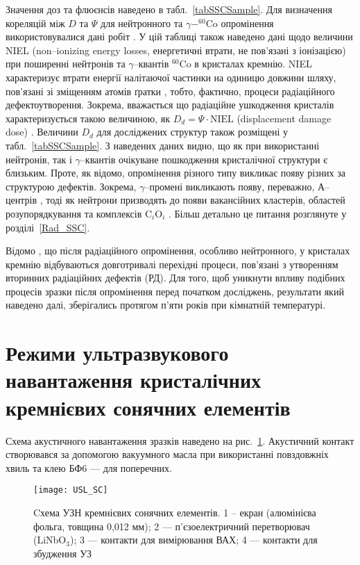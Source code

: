 Значення доз та флюєнсів наведено в табл.~\ref{tabSSCSample}.
Для визначення кореляцій між $D$ та $\Psi$ для нейтронного та $\gamma-^{60}$Co опромінення використовувалися дані робіт \cite{NIEL:Akkerman,Brauning}.
У цій таблиці також наведено дані щодо величини NIEL (non--ionizing energy losses, енергетичні втрати, не пов'язані з іонізацією) при поширенні нейтронів та $\gamma$--квантів $^{60}$Co в кристалах кремнію.
NIEL характеризує втрати енергії налітаючої частинки на одиницю довжини шляху, пов'язані зі зміщенням атомів ґратки \cite{NIEL:Huhtinen,NIEL:Messenger}, тобто, фактично, процеси радіаційного дефектоутворення.
Зокрема, вважається що радіаційне ушкодження кристалів характеризується такою величиною, як $D_d=\Psi\cdot \mbox{NIEL}$ (displacement damage dose) \cite{NIEL:Messenger}.
Величини $D_d$ для досліджених структур також розміщені у табл.~\ref{tabSSCSample}.
З наведених даних видно, що як при використанні нейтронів, так і $\gamma$--квантів очікуване пошкодження кристалічної структури є близьким.
Проте, як відомо,  опромінення різного типу викликає появу різних за структурою дефектів.
Зокрема, $\gamma$--промені викликають появу, переважно, А--центрів \cite{NIEL:Jafari,Gamma:Prabhakara,NIEL:Moll}, тоді як нейтрони призводять до появи вакансійних кластерів\cite{Rew:Srour,Junkes}, областей розупорядкування  \cite{Neutron:Arutyunov} та комплексів C$_i$O$_i$ \cite{NIEL:Moll,neutron:Londos}.
Більш детально це питання розглянуте у розділі~\ref{Rad_SSC}.

Відомо \cite{RadBook}, що після радіаційного опромінення, особливо нейтронного, \cite{NIEL:Moll,Rew:Srour} у кристалах кремнію відбуваються довготривалі перехідні процеси, пов'язані з утворенням вторинних радіаційних дефектів (РД).
Для того, щоб уникнути впливу подібних процесів зразки після опромінення перед початком досліджень, результати який наведено далі, зберігались протягом п'яти років при кімнатній температурі.




\section{Режими ультразвукового навантаження кристалічних кремнієвих сонячних елементів\label{SC:USL}}
Схема акустичного навантаження зразків наведено на рис.~\ref{figUSL:SC}.
Акустичний контакт створювався за допомогою вакуумного масла при використанні повздовжніх хвиль та клею БФ6 --- для поперечних.

\begin{figure}
\center
\texttt{[image: USL\_SC]}%
\caption{\label{figUSL:SC}
Cхема УЗН кремнієвих сонячних елементів.
1 --  екран (алюмінієва фольга, товщина 0,012 мм);
2 --- п'єзоелектричний перетворювач (LiNbO$_3$);
3 --- контакти для вимірювання ВАХ;
4 --- контакти для збудження УЗ
}
\end{figure}


